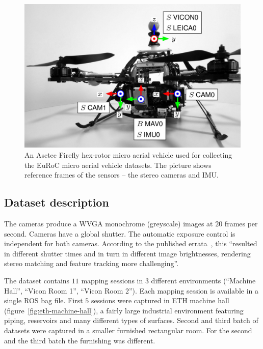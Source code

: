 \begin{figure}
    \centering
    \includegraphics[width=\textwidth]{../img/euroc_platform.jpg}
    \caption[A micro aerial vehicle]{An Asctec Firefly hex-rotor micro aerial vehicle used for collecting the EuRoC micro aerial vehicle datasets. The picture shows reference frames of the sensors -- the stereo cameras and \gls{IMU}.}
    \label{fig:euroc_platform}
\end{figure}

\subsection{Dataset description}

The cameras produce a WVGA monochrome (greyscale) images at $20$ frames per second. Cameras have a global shutter. The automatic exposure control is independent for both cameras. According to the published errata~\citep{Burri2016}, this ``resulted in different shutter times and in turn in different image brightnesses, rendering stereo matching and feature tracking more challenging''.

The dataset contains $11$ mapping sessions in $3$ different environments (``Machine Hall'', ``Vicon Room 1'', ``Vicon Room 2''). Each mapping session is available in a single \gls{ROS} bag file. First $5$ sessions were captured in ETH machine hall (figure~\ref{fig:eth-machine-hall}), a fairly large industrial environment featuring piping, reservoirs and many different types of surfaces. Second and third batch of datasets were captured in a smaller furnished rectangular room. For the second and the third batch the furnishing was different.

